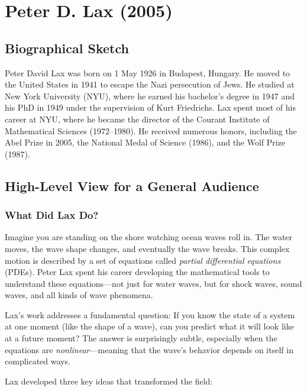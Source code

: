 \chapter{Peter D. Lax (2005)}

\section{Biographical Sketch}



Peter David Lax was born on 1 May 1926 in Budapest, Hungary. He moved to the United States in 1941 to escape the Nazi persecution of Jews. He studied at New York University (NYU), where he earned his bachelor's degree in 1947 and his PhD in 1949 under the supervision of Kurt Friedrichs. Lax spent most of his career at NYU, where he became the director of the Courant Institute of Mathematical Sciences (1972--1980). He received numerous honors, including the Abel Prize in 2005, the National Medal of Science (1986), and the Wolf Prize (1987).

\section{High-Level View for a General Audience}

\subsection{What Did Lax Do?}

Imagine you are standing on the shore watching ocean waves roll in. The water moves, the wave shape changes, and eventually the wave breaks. This complex motion is described by a set of equations called \emph{partial differential equations} (PDEs). Peter Lax spent his career developing the mathematical tools to understand these equations---not just for water waves, but for shock waves, sound waves, and all kinds of wave phenomena.

Lax's work addresses a fundamental question: If you know the state of a system at one moment (like the shape of a wave), can you predict what it will look like at a future moment? The answer is surprisingly subtle, especially when the equations are \emph{nonlinear}---meaning that the wave's behavior depends on itself in complicated ways.

Lax developed three key ideas that transformed the field:

